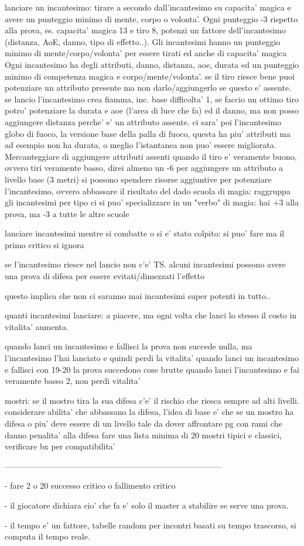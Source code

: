 \documentclass[12pt,a4paper,twoside,openany]{book}
\begin{document}
lanciare un incantesimo: tirare a secondo dall'incantesimo su capacita' magica e avere un punteggio minimo di  mente, corpo o volonta'.  Ogni punteggio -3 rispetto alla prova, es. capacita' magica 13 e tiro 8, potenzi un fattore dell'incantesimo (distanza, AoE, danno, tipo di effetto..). Gli incantesimi hanno un punteggio minimo di mente/corpo/volonta' per essere tirati ed anche di capacita' magica
Ogni incantesimo ha degli attributi, danno, distanza, aoe, durata ed un punteggio minimo di competenza magica e corpo/mente/volonta'. se il tiro riesce bene puoi potenziare un attributo presente ma non darlo/aggiungerlo se questo e' assente. se lancio l'incantesimo crea fiamma, inc. base difficolta' 1, se faccio un ottimo tiro potro' potenziare la durata e aoe (l'area di luce che fa) ed il danno, ma non posso aggiungere distanza perche' e' un attributo assente.
ci sara' poi l'incantesimo globo di fuoco, la versione base della palla di fuoco, questa ha piu' attributi ma ad esempio non ha durata, o meglio l'istantanea non puo' essere migliorata.
Mercanteggiare di aggiungere attributi assenti quando il tiro e' veramente buono, ovvero tiri veramente basso, direi almeno un -6 per aggiungere un attributo a livello base (3 metri)
si possono spendere risorse aggiuntive per potenziare l'incantesimo, ovvero abbassare il risultato del dado
scuola di magia: raggruppa gli incantesimi per tipo
ci si puo' specializzare in un "verbo" di magia: hai +3 alla prova, ma -3 a tutte le altre scuole

lanciare incantesimi mentre si combatte o si e' stato colpito: si puo' fare ma il primo critico si ignora

se l'incantesimo riesce nel lancio non c'e' TS. alcuni incantesimi possono avere una prova di difesa per essere evitati/dimezzati l'effetto

questo implica che non ci saranno mai incantesimi super potenti in tutto..

quanti incantesimi lanciare:  a piacere, ma ogni volta che lanci lo stesso il costo in vitalita' aumenta. 

quando lanci un incantesimo e fallisci la prova non succede nulla, ma l'incantesimo l'hai lanciato e quindi perdi la vitalita' 
quando lanci un incantesimo e fallisci con 19-20 la prova succedono cose  brutte
quando lanci l'incantesimo e fai veramente basso 2, non perdi vitalita'


mostri:
se il mostro tira la sua difesa c'e' il rischio che riesca sempre ad alti livelli. considerare abilita' che abbassano la difesa, l'idea di base e' che se un mostro ha difesa  o piu' deve essere di un livello tale da dover affrontare pg con rami che danno penalita' alla difesa
fare una lista minima di 20 mostri tipici e classici, verificare bx per compatibilita'


--------------------------------------------------------------------------------



- fare 2 o 20  successo critico o fallimento  critico

- il giocatore dichiara cio' che fa e' solo il master a stabilire se serve una prova. 

- il tempo e' un fattore, tabelle random per incontri basati su tempo trascorso, si computa il tempo reale.
\end{document}
